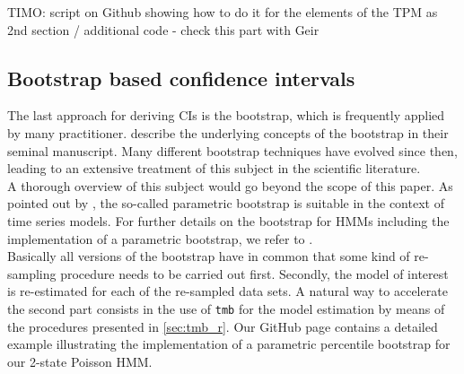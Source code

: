 \documentclass[bimj,fleqn]{w-art}\usepackage[]{graphicx}\usepackage[]{color}
\theoremstyle{plain}
\theoremstyle{definition}
\begin{document}
TIMO: script on Github showing how to do it for the elements of the TPM as 2nd section / additional code - check this part with Geir





\subsection{Bootstrap based confidence intervals}
\label{sec:bootstrapping}

The last approach for deriving CIs is the bootstrap, which is frequently applied by many practitioner. \citet{efron} describe the underlying concepts of the bootstrap in their seminal manuscript. Many different bootstrap techniques have evolved since then, leading to an extensive treatment of this subject in the scientific literature.\\
A thorough overview of this subject would go beyond the scope of this paper. As pointed out by \citet{hardle}, the so-called parametric bootstrap is suitable in the context of time series models. For further details on the bootstrap for HMMs including the implementation of a parametric bootstrap, we refer to \citet[][Ch.~3, pp.~56-60]{zucchini}.\\ 
Basically all versions of the bootstrap have in common that some kind of re-sampling procedure needs to be carried out first. Secondly, the model of interest is re-estimated for each of the re-sampled data sets. A natural way to accelerate the second part consists in the use of \texttt{tmb} for the model estimation by means of the procedures presented in \autoref{sec:tmb_r}. Our GitHub page contains a detailed example illustrating the implementation of a parametric percentile bootstrap for our 2-state Poisson HMM.
\end{document}
